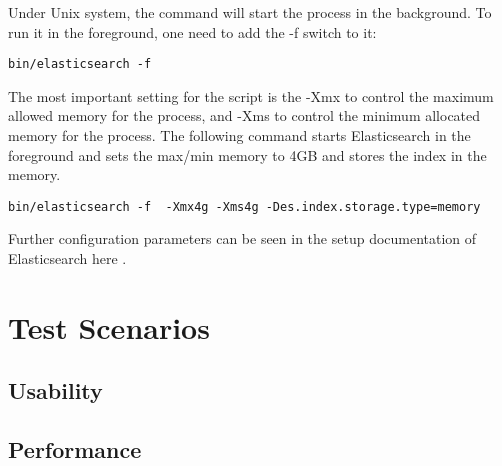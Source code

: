 Under Unix system, the command will start the process in the background. To run it in the foreground, one need to add the -f switch to it:
\begin{code}
\begin{verbatim}
bin/elasticsearch -f
\end{verbatim}
\end{code}

The most important setting for the script is the -Xmx to control the maximum allowed memory for the process, and -Xms to control the minimum allocated memory for the process. The following command starts Elasticsearch in the foreground and sets the max/min memory to 4GB and stores the index in the memory. 
\begin{code}
\begin{verbatim}
bin/elasticsearch -f  -Xmx4g -Xms4g -Des.index.storage.type=memory
\end{verbatim}
\end{code}

Further configuration parameters can be seen in the setup documentation of Elasticsearch here \cite{elastic_setup}.

\section{Test Scenarios\label{sec:eval__te_sc}}
	\subsection{Usability\label{seq:eval_usab}}
	
	\subsection{Performance\label{seq:eval_perf}}